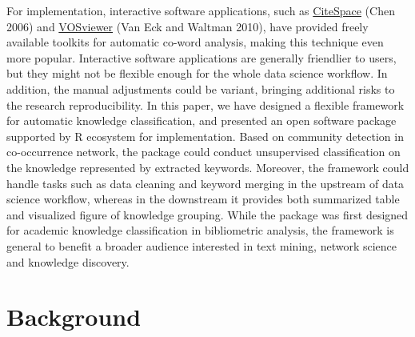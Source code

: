 For implementation, interactive software applications, such as \href{http://cluster.cis.drexel.edu/~cchen/citespace/}{CiteSpace} (Chen 2006) and \href{https://www.vosviewer.com/}{VOSviewer} (Van Eck and Waltman 2010), have provided freely available toolkits for automatic co-word analysis, making this technique even more popular. Interactive software applications are generally friendlier to users, but they might not be flexible enough for the whole data science workflow. In addition, the manual adjustments could be variant, bringing additional risks to the research reproducibility. In this paper, we have designed a flexible framework for automatic knowledge classification, and presented an open software package  supported by R ecosystem for implementation. Based on community detection in co-occurrence network, the package could conduct unsupervised classification on the knowledge represented by extracted keywords. Moreover, the framework could handle tasks such as data cleaning and keyword merging in the upstream of data science workflow, whereas in the downstream it provides both summarized table and visualized figure of knowledge grouping. While the package was first designed for academic knowledge classification in bibliometric analysis, the framework is general to benefit a broader audience interested in text mining, network science and knowledge discovery.

\hypertarget{background}{%
\section{Background}\label{background}}

